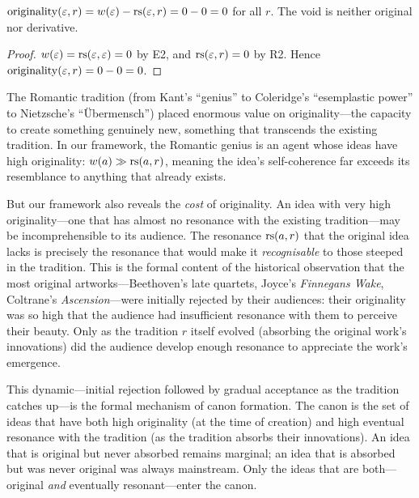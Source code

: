 \begin{theorem}
\label{thm:void-zero-originality}
$\mathrm{originality}(\varepsilon, r) = w(\varepsilon) - \mathrm{rs}(\varepsilon, r) = 0 - 0 = 0$ for all $r$.  The void is neither original nor derivative.
\end{theorem}

\begin{proof}
$w(\varepsilon) = \mathrm{rs}(\varepsilon, \varepsilon) = 0$ by E2, and $\mathrm{rs}(\varepsilon, r) = 0$ by R2.  Hence $\mathrm{originality}(\varepsilon, r) = 0 - 0 = 0$.
\end{proof}

\begin{remark}
\label{rem:originality-genius}
The Romantic tradition (from Kant's ``genius'' to Coleridge's ``esemplastic power'' to Nietzsche's ``Übermensch'') placed enormous value on originality---the capacity to create something genuinely new, something that transcends the existing tradition.  In our framework, the Romantic genius is an agent whose ideas have high originality: $w(a) \gg \mathrm{rs}(a, r)$, meaning the idea's self-coherence far exceeds its resemblance to anything that already exists.

But our framework also reveals the \emph{cost} of originality.  An idea with very high originality---one that has almost no resonance with the existing tradition---may be incomprehensible to its audience.  The resonance $\mathrm{rs}(a, r)$ that the original idea lacks is precisely the resonance that would make it \emph{recognisable} to those steeped in the tradition.  This is the formal content of the historical observation that the most original artworks---Beethoven's late quartets, Joyce's \textit{Finnegans Wake}, Coltrane's \textit{Ascension}---were initially rejected by their audiences: their originality was so high that the audience had insufficient resonance with them to perceive their beauty.  Only as the tradition $r$ itself evolved (absorbing the original work's innovations) did the audience develop enough resonance to appreciate the work's emergence.

This dynamic---initial rejection followed by gradual acceptance as the tradition catches up---is the formal mechanism of canon formation.  The canon is the set of ideas that have both high originality (at the time of creation) and high eventual resonance with the tradition (as the tradition absorbs their innovations).  An idea that is original but never absorbed remains marginal; an idea that is absorbed but was never original was always mainstream.  Only the ideas that are both---original \emph{and} eventually resonant---enter the canon.
\end{remark}

